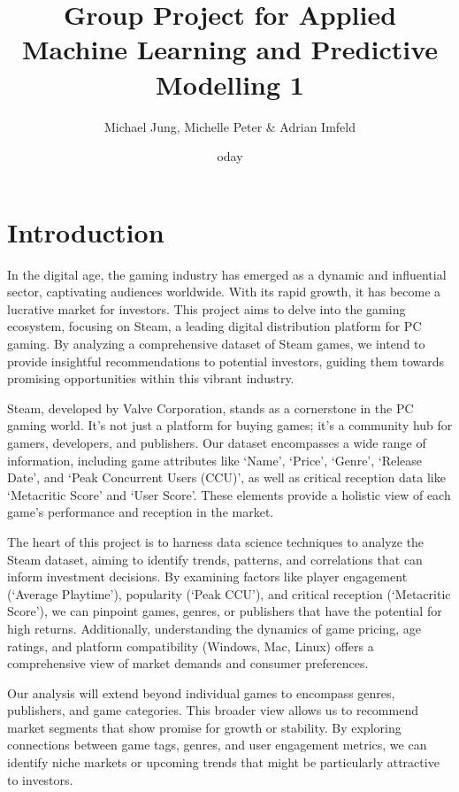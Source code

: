 \documentclass[
]{article}
\title{Group Project for Applied Machine Learning and Predictive
Modelling 1}
\author{Michael Jung, Michelle Peter \& Adrian Imfeld}
\date{oday}
\begin{document}
\maketitle

{
\hypersetup{linkcolor=}
\setcounter{tocdepth}{3}
\tableofcontents
}
\newpage

\hypertarget{introduction}{%
\section{Introduction}\label{introduction}}

In the digital age, the gaming industry has emerged as a dynamic and
influential sector, captivating audiences worldwide. With its rapid
growth, it has become a lucrative market for investors. This project
aims to delve into the gaming ecosystem, focusing on Steam, a leading
digital distribution platform for PC gaming. By analyzing a
comprehensive dataset of Steam games, we intend to provide insightful
recommendations to potential investors, guiding them towards promising
opportunities within this vibrant industry.

Steam, developed by Valve Corporation, stands as a cornerstone in the PC
gaming world. It's not just a platform for buying games; it's a
community hub for gamers, developers, and publishers. Our dataset
encompasses a wide range of information, including game attributes like
`Name', `Price', `Genre', `Release Date', and `Peak Concurrent Users
(CCU)', as well as critical reception data like `Metacritic Score' and
`User Score'. These elements provide a holistic view of each game's
performance and reception in the market.

The heart of this project is to harness data science techniques to
analyze the Steam dataset, aiming to identify trends, patterns, and
correlations that can inform investment decisions. By examining factors
like player engagement (`Average Playtime'), popularity (`Peak CCU'),
and critical reception (`Metacritic Score'), we can pinpoint games,
genres, or publishers that have the potential for high returns.
Additionally, understanding the dynamics of game pricing, age ratings,
and platform compatibility (Windows, Mac, Linux) offers a comprehensive
view of market demands and consumer preferences.

Our analysis will extend beyond individual games to encompass genres,
publishers, and game categories. This broader view allows us to
recommend market segments that show promise for growth or stability. By
exploring connections between game tags, genres, and user engagement
metrics, we can identify niche markets or upcoming trends that might be
particularly attractive to investors.
\end{document}
